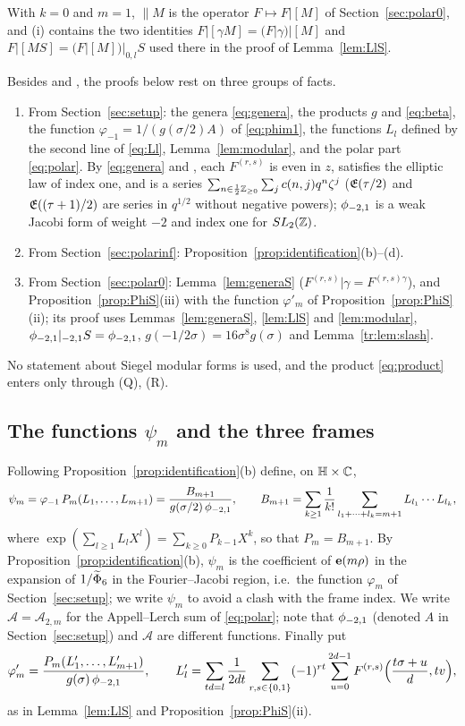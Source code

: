 With $k=0$ and $m=1$, $\|M$ is the operator $F\mapsto F|[M]$ of Section~\ref{sec:polar0}, and (i) contains the two identities $F|[\gamma M]=(F|\gamma)|[M]$ and $F|[MS]=(F|[M])|_{0,l}S$ used there in the proof of Lemma~\ref{lem:LlS}.

\medskip\noindent Besides \cite{EZ85} and \cite{Ahl79}, the proofs below rest on three groups of facts.
\begin{enumerate}
\item[(P)] From Section~\ref{sec:setup}: the genera \eqref{eq:genera}, the products $g$ and \eqref{eq:beta}, the function $\varphi_{-1}=1/(g(\sigma/2)A)$ of \eqref{eq:phim1}, the functions $L_l$ defined by the second line of \eqref{eq:Ll}, Lemma~\ref{lem:modular}, and the polar part \eqref{eq:polar}. By \eqref{eq:genera} and \cite[Theorem~9.3]{EZ85}, each $F^{(r,s)}$ is even in $z$, satisfies the elliptic law of index one, and is a series $\sum_{n\in\frac12\mathbb{Z}_{\ge0}}\sum_jc(n,j)q^n\zeta^j$ ($\mathfrak E(\tau/2)$ and $\mathfrak E((\tau+1)/2)$ are series in $q^{1/2}$ without negative powers); $\phi_{-2,1}$ is a weak Jacobi form of weight $-2$ and index one for $SL_2(\mathbb{Z})$.
\item[(Q)] From Section~\ref{sec:polarinf}: Proposition~\ref{prop:identification}(b)--(d).
\item[(R)] From Section~\ref{sec:polar0}: Lemma~\ref{lem:generaS} ($F^{(r,s)}|\gamma=F^{(r,s)\gamma}$), and Proposition~\ref{prop:PhiS}(iii) with the function $\varphi'_m$ of Proposition~\ref{prop:PhiS}(ii); its proof uses Lemmas~\ref{lem:generaS}, \ref{lem:LlS} and \ref{lem:modular}, $\phi_{-2,1}|_{-2,1}S=\phi_{-2,1}$, $g(-1/2\sigma)=16\sigma^8g(\sigma)$ and Lemma~\ref{tr:lem:slash}.
\end{enumerate}
No statement about Siegel modular forms is used, and the product \eqref{eq:product} enters only through (Q), (R).

\subsection{The functions $\psi_m$ and the three frames}\label{tr:frames}
Following Proposition~\ref{prop:identification}(b) define, on $\mathbb{H}\times\mathbb{C}$,
\begin{equation}\label{tr:psim}
\psi_m=\varphi_{-1}\,P_m(L_1,\dots,L_{m+1})=\frac{B_{m+1}}{g(\sigma/2)\,\phi_{-2,1}},\qquad B_{m+1}=\sum_{k\ge1}\frac1{k!}\sum_{l_1+\dots+l_k=m+1}L_{l_1}\cdots L_{l_k},
\end{equation}
where $\exp(\sum_{l\ge1}L_lX^l)=\sum_{k\ge0}P_{k-1}X^k$, so that $P_m=B_{m+1}$. By Proposition~\ref{prop:identification}(b), $\psi_m$ is the coefficient of $\mathbf e(m\rho)$ in the expansion of $1/\widetilde\Phi_6$ in the Fourier--Jacobi region, i.e.\ the function $\varphi_m$ of Section~\ref{sec:setup}; we write $\psi_m$ to avoid a clash with the frame index. We write $\mathcal A=\mathcal A_{2,m}$ for the Appell--Lerch sum of \eqref{eq:polar}; note that $\phi_{-2,1}$ (denoted $A$ in Section~\ref{sec:setup}) and $\mathcal A$ are different functions. Finally put
\[
\varphi'_m=\frac{P_m(L'_1,\dots,L'_{m+1})}{g(\sigma)\,\phi_{-2,1}},\qquad L'_l=\sum_{td=l}\frac1{2dt}\sum_{r,s\in\{0,1\}}(-1)^{rt}\sum_{u=0}^{2d-1}F^{(r,s)}\Big(\frac{t\sigma+u}d,tv\Big),
\]
as in Lemma~\ref{lem:LlS} and Proposition~\ref{prop:PhiS}(ii).

